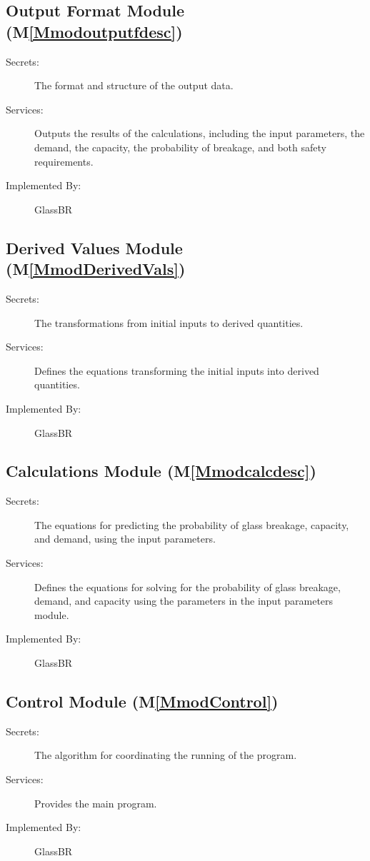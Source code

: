 \documentclass[12pt]{article}
\begin{document}
\subsection{Output Format Module (M\ref{Mmodoutputfdesc})}
\label{Sec:OutpFormModu()}
\begin{description}
\item[Secrets:]The format and structure of the output data.
\item[Services:]Outputs the results of the calculations, including the input parameters, the demand, the capacity, the probability of breakage, and both safety requirements.
\item[Implemented By:]GlassBR
\end{description}
\subsection{Derived Values Module (M\ref{MmodDerivedVals})}
\label{Sec:DeriValuModu()}
\begin{description}
\item[Secrets:]The transformations from initial inputs to derived quantities.
\item[Services:]Defines the equations transforming the initial inputs into derived quantities.
\item[Implemented By:]GlassBR
\end{description}
\subsection{Calculations Module (M\ref{Mmodcalcdesc})}
\label{Sec:CalcModu()}
\begin{description}
\item[Secrets:]The equations for predicting the probability of glass breakage, capacity, and demand, using the input parameters.
\item[Services:]Defines the equations for solving for the probability of glass breakage, demand, and capacity using the parameters in the input parameters module.
\item[Implemented By:]GlassBR
\end{description}
\subsection{Control Module (M\ref{MmodControl})}
\label{Sec:ContModu()}
\begin{description}
\item[Secrets:]The algorithm for coordinating the running of the program.
\item[Services:]Provides the main program.
\item[Implemented By:]GlassBR
\end{description}
\end{document}
